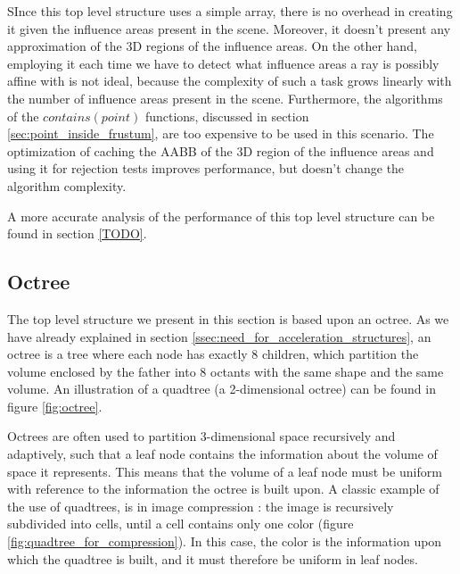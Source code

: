 \documentclass{PoliMi_MasterThesis}
\begin{document}
SInce this top level structure uses a simple array, there is no overhead in creating it given the influence areas present in the scene. Moreover, it doesn't present any approximation of the 3D regions of the influence areas. On the other hand, employing it each time we have to detect what influence areas a ray is possibly affine with is not ideal, because the complexity of such a task grows linearly with the number of influence areas present in the scene. Furthermore, the algorithms of the $contains(point)$ functions, discussed in section \ref{sec:point_inside_frustum}, are too expensive to be used in this scenario. The optimization of caching the AABB of the 3D region of the influence areas and using it for rejection tests improves performance, but doesn't change the algorithm complexity.

A more accurate analysis of the performance of this top level structure can be found in section \ref{TODO}.

\subsection{Octree} \label{ssec:top_level_octree}
The top level structure we present in this section is based upon an octree. As we have already explained in section \ref{ssec:need_for_acceleration_structures}, an octree is a tree where each node has exactly 8 children, which partition the volume enclosed by the father into 8 octants with the same shape and the same volume. An illustration of a quadtree (a 2-dimensional octree) can be found in figure \ref{fig:octree}.

Octrees are often used to partition 3-dimensional space recursively and adaptively, such that a leaf node contains the information about the volume of space it represents. This means that the volume of a leaf node must be uniform with reference to the information the octree is built upon. A classic example of the use of quadtrees, is in image compression \cite{TODO}: the image is recursively subdivided into cells, until a cell contains only one color (figure \ref{fig:quadtree_for_compression}). In this case, the color is the information upon which the quadtree is built, and it must therefore be uniform in leaf nodes.
\end{document}
